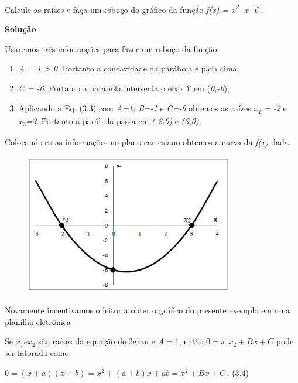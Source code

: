 \begin{texemplo}
Calcule as raízes e faça um esboço do gráfico da função \textit{f(x) = x\textsuperscript{2} -x -6} . 

\textbf{Solução}: 

Usaremos três informações para fazer um esboço da função:

\begin{enumerate}
	\item \textit{A = 1 > 0}. Portanto a concavidade da parábola é para cima;

	\item \textit{C = -6}. Portanto a parábola intersecta o eixo \textit{Y} em (\textit{0,-6});

	\item Aplicando a Eq. (3.3) com \textit{A=1; B=-1 }e\textit{ C=-6 }obtemos as raízes \textit{x\textsubscript{1} = -2}  e  \textit{x\textsubscript{2}=3}. Portanto a parábola passa em \textit{(-2,0) }e\textit{ (3,0).} 
\end{enumerate}

Colocando estas informações no plano cartesiano obtemos a curva da \textit{f(x)} dada.

\begin{figure}[H]
	\begin{Center}
		\includegraphics[width=3.57in,height=2.45in]{capitulos/funcao_do_segundo_grau/media/image5.png}
	\end{Center}
\end{figure}

Novamente incentivamos o leitor a obter o gráfico do presente exemplo em uma planilha eletrônica \qedsymbol{}
\end{texemplo}

Se $x_1 e x_2$ são raízes da equação de 2\degree grau e $A = 1$, então $0 = x$
$x_2 + Bx + C$ pode ser fatorada como

     \( 0= \left( x+a \right)  \left( x+b \right) =x^{2}+ \left( a+b \right) x+ab= x^{2}+Bx+C_{~ } \). \tab (3.4)

